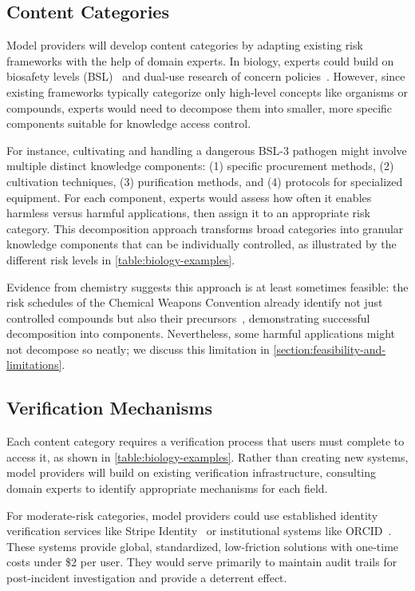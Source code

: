 \documentclass{article}
\theoremstyle{plain}
\theoremstyle{definition}
\theoremstyle{remark}
\begin{document}
\subsection{Content Categories} \label{section:content-categories}

Model providers will develop content categories by adapting existing risk frameworks with the help of domain experts.
In biology, experts could build on biosafety levels (BSL)~\cite{CDC_BMBL_2020} and dual-use research of concern policies~\cite{USG_DURC_2012}.
However, since existing frameworks typically categorize only high-level concepts like organisms or compounds, experts would need to decompose them into smaller, more specific components suitable for knowledge access control.

For instance, cultivating and handling a dangerous BSL-3 pathogen might involve multiple distinct knowledge components: (1) specific procurement methods, (2) cultivation techniques, (3) purification methods, and (4) protocols for specialized equipment.
For each component, experts would assess how often it enables harmless versus harmful applications, then assign it to an appropriate risk category.
This decomposition approach transforms broad categories into granular knowledge components that can be individually controlled, as illustrated by the different risk levels in \cref{table:biology-examples}.

Evidence from chemistry suggests this approach is at least sometimes feasible: the risk schedules of the Chemical Weapons Convention already identify not just controlled compounds but also their precursors~\cite{OPCW_CWC_1993}, demonstrating successful decomposition into components.
Nevertheless, some harmful applications might not decompose so neatly; we discuss this limitation in \cref{section:feasibility-and-limitations}.

\subsection{Verification Mechanisms} \label{section:verification-mechanisms}

Each content category requires a verification process that users must complete to access it, as shown in \cref{table:biology-examples}.
Rather than creating new systems, model providers will build on existing verification infrastructure, consulting domain experts to identify appropriate mechanisms for each field.

For moderate-risk categories, model providers could use established identity verification services like Stripe Identity~\cite{stripe_identity_2024} or institutional systems like ORCID~\cite{orcid_2024}.
These systems provide global, standardized, low-friction solutions with one-time costs under \$2 per user.
They would serve primarily to maintain audit trails for post-incident investigation and provide a deterrent effect.
\end{document}
